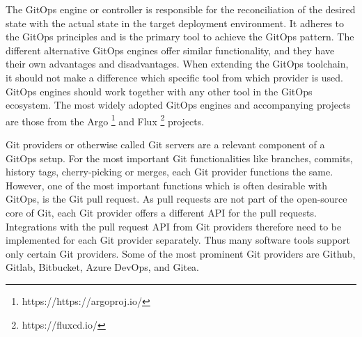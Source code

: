 

The GitOps engine or controller is responsible for the
reconciliation of the desired state with the actual state
in the target deployment environment.
It adheres to the GitOps principles and is the primary tool
to achieve the GitOps pattern.
The different alternative GitOps engines offer similar functionality,
and they have their own advantages and disadvantages.
When extending the GitOps toolchain, it should not make a difference which specific
tool from which provider is used.
GitOps engines should work together with any other tool in the GitOps ecosystem.
The most widely adopted GitOps engines and accompanying projects are those from
the Argo
\footnote{https://https://argoproj.io/}
and Flux
\footnote{https://fluxcd.io/}
projects.









Git providers or otherwise called Git servers are a relevant component of
a GitOps setup.
For the most important Git functionalities like branches, commits, history
tags, cherry-picking or merges, each Git provider functions the same.
However, one of the most important functions which is often desirable with GitOps, is the Git pull request.
As pull requests are not part of the open-source core of Git,
each Git provider offers a different API for the pull requests.
Integrations with the pull request API from Git providers therefore need to be implemented
for each Git provider separately. Thus many software tools support only certain Git providers.
Some of the most prominent Git providers are
Github,
Gitlab,
Bitbucket,
Azure DevOps, and
Gitea.





























